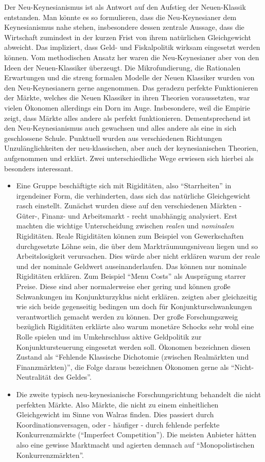 Der Neu-Keynesianismus ist als Antwort auf den Aufstieg der Neuen-Klassik entstanden. Man könnte es so formulieren, dass die Neu-Keynesianer dem Keynesianismus nahe stehen, insbesondere dessen zentrale Aussage, dass die Wirtschaft zumindest in der kurzen Frist von ihrem natürlichen Gleichgewicht abweicht. Das impliziert, dass Geld- und Fiskalpolitik wirksam eingesetzt werden können. Vom methodischen Ansatz her waren die Neu-Keynesianer aber von den Ideen der Neuen-Klassiker überzeugt. Die Mikrofundierung, die Rationalen Erwartungen und die streng formalen Modelle der Neuen Klassiker wurden von den Neu-Keynesianern gerne angenommen. Das geradezu perfekte Funktionieren der Märkte, welches die Neuen Klassiker in ihren Theorien voraussetzten, war vielen Ökonomen allerdings ein Dorn im Auge. Insbesondere, weil die Empirie zeigt, dass Märkte alles andere als perfekt funktionieren. Dementsprechend ist den Neu-Keynesianismus auch gewachsen und alles andere als eine in sich geschlossene Schule. Punktuell wurden aus verschiedenen Richtungen Unzulänglichkeiten der neu-klassischen, aber auch der keynesianischen Theorien, aufgenommen und erklärt.
Zwei unterschiedliche Wege erwiesen sich hierbei als besonders interessant.
\begin{itemize}
	\item Eine Gruppe beschäftigte sich mit Rigiditäten, also "`Starrheiten"' in irgendeiner Form, die verhinderten, dass sich das natürliche Gleichgewicht rasch einstellt. Zunächst wurden diese auf den verschiedenen Märkten - Güter-, Finanz- und Arbeitsmarkt - recht unabhängig analysiert. Erst \textcite{RomerDavid1990} machten die wichtige Unterscheidung zwischen \textit{realen} und \textit{nominalen} Rigiditäten. Reale Rigiditäten können zum Beispiel von Gewerkschaften durchgesetzte Löhne sein, die über dem Markträumungsniveau liegen und so Arbeitslosigkeit verursachen. Dies würde aber nicht erklären warum der reale und der nominale Geldwert auseinanderlaufen. Das können nur nominale Rigiditäten erklären. Zum Beispiel "`Menu Costs"' als Ausprägung starrer Preise. Diese sind aber normalerweise eher gering und können große Schwankungen im Konjunkturzyklus nicht erklären. \textcite{RomerDavid1990} zeigten aber gleichzeitig wie sich beide gegenseitig bedingen um doch für Konjunkturschwankungen verantwortlich gemacht werden zu können. Der große Forschungszweig bezüglich Rigiditäten erklärte also warum monetäre Schocks sehr wohl eine Rolle spielen und im Umkehrschluss aktive Geldpolitik zur Konjunktursteuerung eingesetzt werden soll. Ökonomen bezeichnen diesen Zustand als "`Fehlende Klassische Dichotomie (zwischen Realmärkten und Finanzmärkten)"', die Folge daraus bezeichnen Ökonomen gerne als "`Nicht-Neutralität des Geldes"'.
	\item Die zweite typisch neu-keynesianische Forschungsrichtung behandelt die nicht perfekten Märkte. Also Märkte, die nicht zu einem einheitlichen Gleichgewicht im Sinne von Walras finden. Dies passiert durch Koordinationsversagen, oder - häufiger - durch fehlende perfekte Konkurrenzmärkte ("`Imperfect Competition"'). Die meisten Anbieter hätten also eine gewisse Marktmacht und agierten demnach auf "`Monopolistischen Konkurrenzmärkten"'.
\end{itemize}
